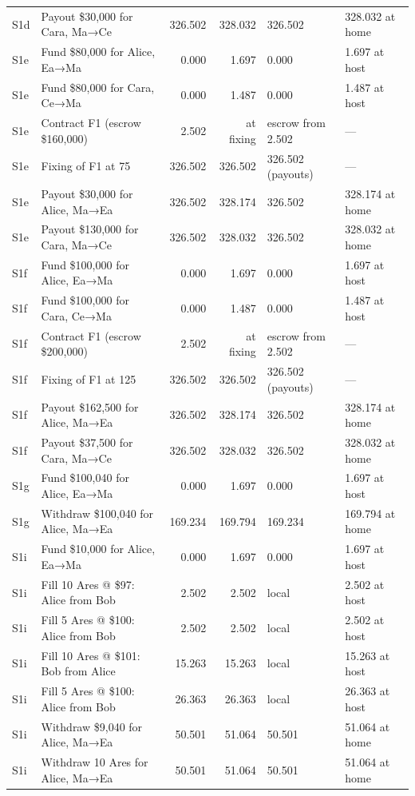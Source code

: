 \documentclass[10pt,letterpaper]{article}
\begin{document}
{\begin{longtable}{@{}l>{\raggedright\arraybackslash}p{5.2cm}rrll@{}}
S1d & Payout \$30,000 for Cara, Ma→Ce & 326.502 & 328.032 & 326.502 & 328.032 at home \\
S1e & Fund \$80,000 for Alice, Ea→Ma & 0.000 & 1.697 & 0.000 & 1.697 at host \\
S1e & Fund \$80,000 for Cara, Ce→Ma & 0.000 & 1.487 & 0.000 & 1.487 at host \\
S1e & Contract F1 (escrow \$160,000) & 2.502 & at fixing & escrow from 2.502 & — \\
S1e & Fixing of F1 at 75 & 326.502 & 326.502 & 326.502 (payouts) & — \\
S1e & Payout \$30,000 for Alice, Ma→Ea & 326.502 & 328.174 & 326.502 & 328.174 at home \\
S1e & Payout \$130,000 for Cara, Ma→Ce & 326.502 & 328.032 & 326.502 & 328.032 at home \\
S1f & Fund \$100,000 for Alice, Ea→Ma & 0.000 & 1.697 & 0.000 & 1.697 at host \\
S1f & Fund \$100,000 for Cara, Ce→Ma & 0.000 & 1.487 & 0.000 & 1.487 at host \\
S1f & Contract F1 (escrow \$200,000) & 2.502 & at fixing & escrow from 2.502 & — \\
S1f & Fixing of F1 at 125 & 326.502 & 326.502 & 326.502 (payouts) & — \\
S1f & Payout \$162,500 for Alice, Ma→Ea & 326.502 & 328.174 & 326.502 & 328.174 at home \\
S1f & Payout \$37,500 for Cara, Ma→Ce & 326.502 & 328.032 & 326.502 & 328.032 at home \\
S1g & Fund \$100,040 for Alice, Ea→Ma & 0.000 & 1.697 & 0.000 & 1.697 at host \\
S1g & Withdraw \$100,040 for Alice, Ma→Ea & 169.234 & 169.794 & 169.234 & 169.794 at home \\
S1i & Fund \$10,000 for Alice, Ea→Ma & 0.000 & 1.697 & 0.000 & 1.697 at host \\
S1i & Fill 10 Ares @ \$97: Alice from Bob & 2.502 & 2.502 & local & 2.502 at host \\
S1i & Fill 5 Ares @ \$100: Alice from Bob & 2.502 & 2.502 & local & 2.502 at host \\
S1i & Fill 10 Ares @ \$101: Bob from Alice & 15.263 & 15.263 & local & 15.263 at host \\
S1i & Fill 5 Ares @ \$100: Alice from Bob & 26.363 & 26.363 & local & 26.363 at host \\
S1i & Withdraw \$9,040 for Alice, Ma→Ea & 50.501 & 51.064 & 50.501 & 51.064 at home \\
S1i & Withdraw 10 Ares for Alice, Ma→Ea & 50.501 & 51.064 & 50.501 & 51.064 at home \\
\end{longtable}}
\end{document}
